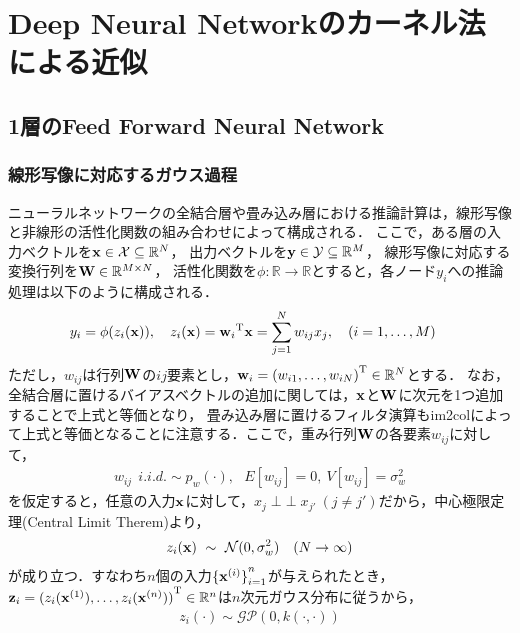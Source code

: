 \documentclass[11pt,a4j]{article}
\newcommand{\indep}{\mathop{\perp\!\!\!\perp}}
\begin{document}
  \section{Deep Neural Networkのカーネル法による近似}
    \subsection{1層のFeed Forward Neural Network}
      \subsubsection{線形写像に対応するガウス過程}
        ニューラルネットワークの全結合層や畳み込み層における推論計算は，線形写像と非線形の活性化関数の組み合わせによって構成される．
        ここで，ある層の入力ベクトルを${\bf x} \in \mathcal{X} \subseteq \mathbb{R}^{N}$，
        出力ベクトルを${\bf y} \in \mathcal{Y} \subseteq \mathbb{R}^{M}$，
        線形写像に対応する変換行列を${\bf W} \in \mathbb{R}^{M \times N}$，
        活性化関数を$\phi: \mathbb{R} \to \mathbb{R}$とすると，各ノード${y}_i$への推論処理は以下のように構成される．
        \begin{align}
          y_i &= \phi(z_i({\bf x})), ~~~ z_i({\bf x}) = {{\bf w}_i}^{\mathrm{T}} {\bf x} = \sum_{j=1}^{N} {w}_{ij} {x}_j, ~~~ (i=1,\dots,M) \label{form:nn_inference}
        \end{align}
        ただし，$w_{ij}$は行列$\bf W$の$ij$要素とし，${\bf w}_i = {( w_{i1}, \dots, w_{iN} )}^{\mathrm{T}} \in \mathbb{R}^{N}$とする．
        なお，全結合層に置けるバイアスベクトルの追加に関しては，$\bf x$と$\bf W$に次元を1つ追加することで上式と等価となり，
        畳み込み層に置けるフィルタ演算もim2colによって上式と等価となることに注意する．ここで，重み行列$\bf W$の各要素$w_{ij}$に対して，
        \begin{align}
          w_{ij} ~~ i.i.d. \sim p_w(\cdot), ~~~
          E[w_{ij}] = 0, ~ V[w_{ij}] = \sigma_w^2
        \end{align}
        を仮定すると，任意の入力${\bf x}$に対して，$x_j \indep x_{j'} ~ (j \neq j' )$だから，中心極限定理(Central Limit Therem)より，
        \begin{align}
          z_i({\bf x}) ~ \sim ~ \mathcal{N}(0, \sigma_w^2) ~~~ (N \to \infty)
        \end{align}
        が成り立つ．すなわち$n$個の入力${\{ {\bf x}^{(i)} \}}_{i=1}^{n}$が与えられたとき，
        ${\bf z}_i = { ( z_i({\bf x}^{(1)}),\dots,z_i({\bf x}^{(n)}) ) }^{\mathrm{T}} \in \mathbb{R}^{n}$は$n$次元ガウス分布に従うから，
        \begin{align}
          z_i(\cdot) \sim \mathcal{GP}(0, k(\cdot,\cdot))
        \end{align}
\end{document}
